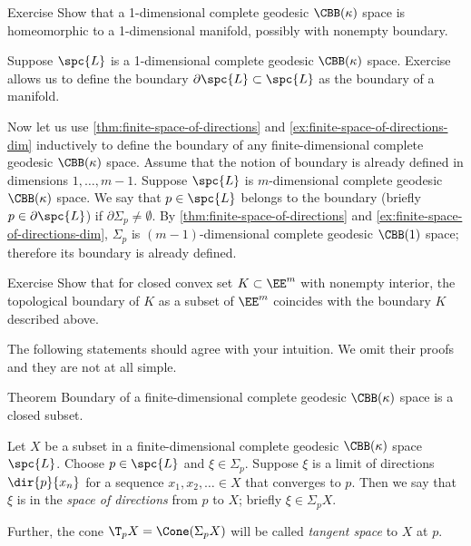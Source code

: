 {\sloppy

\begin{thm}{Exercise}
Show that a 1-dimensional complete geodesic $\CBB(\kappa)$ space is homeomorphic to a 1-dimensional manifold, possibly with nonempty boundary.
\end{thm}

}

Suppose $\spc{L}$ is a 1-dimensional complete geodesic $\CBB(\kappa)$ space.
Exercise allows us to define the boundary $\partial\spc{L}\subset \spc{L}$ as the boundary of a manifold.

Now let us use \ref{thm:finite-space-of-directions} and \ref{ex:finite-space-of-directions-dim} inductively to define the boundary of any finite-dimensional complete geodesic $\CBB(\kappa)$ space.
Assume that the notion of boundary is already defined in dimensions $1,\dots,m-1$.
Suppose  $\spc{L}$ is $m$-dimensional complete geodesic $\CBB(\kappa)$ space.
We say that $p\in \spc{L}$ belongs to the boundary (briefly $p\in \partial \spc{L}$) if 
$\partial\Sigma_p\ne\emptyset$.
By \ref{thm:finite-space-of-directions} and \ref{ex:finite-space-of-directions-dim}, $\Sigma_p$ is $(m-1)$-dimensional complete geodesic $\CBB(1)$ space;
therefore its boundary is already defined.



\begin{thm}{Exercise}
Show that for closed convex set $K\subset \EE^m$ with nonempty interior, the topological boundary of $K$ as a subset of $\EE^m$ coincides with the boundary $K$ described above.
\end{thm}


The following statements should agree with your intuition.
We omit their proofs and they are not at all simple.

\begin{thm}{Theorem}
Boundary of a finite-dimensional complete geodesic $\CBB(\kappa)$ space is a closed subset.
\end{thm}

Let $X$ be a subset in a finite-dimensional complete geodesic $\CBB(\kappa)$ space $\spc{L}$.
Choose $p\in \spc{L}$ and $\xi\in \Sigma_p$.
Suppose $\xi$ is a limit of directions $\dir{p}{x_n}$ for a sequence $x_1,x_2,\dots{}\in X$ that converges to $p$.
Then we say that $\xi$ is in the \emph{space of directions} from $p$ to $X$; briefly $\xi\in\Sigma_pX$.

Further, the cone $\T_pX=\Cone(\Sigma_pX)$ will be called \emph{tangent space} to $X$ at $p$.

